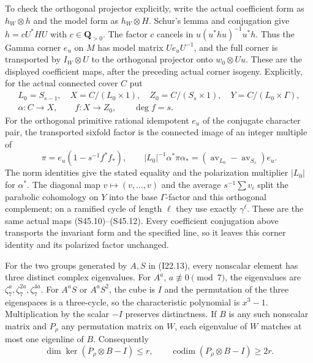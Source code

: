 To check the orthogonal projector explicitly, write the
actual coefficient form as $h_W\otimes h$ and the model
form as $h_W\otimes H$. Schur's lemma and conjugation give
$h=cU^*HU$ with $c\in\mathbf Q_{>0}$. The factor $c$
cancels in $u(u^*hu)^{-1}u^*h$. Thus the Gamma corner
$e_u$ on $M$ has model matrix $Ue_uU^{-1}$, and the full
corner is transported by $I_W\otimes U$ to the orthogonal
projector onto $w_0\otimes Uu$. These are the displayed
coefficient maps, after the preceding actual corner isogeny.
Explicitly, for the actual connected cover $C$ put
\[
 \begin{gathered}
 L_0=S_{s-1},\quad X=C/(L_0\times1),\quad
 Z_0=C/(S_s\times1),\quad Y=C/(L_0\times\Gamma),\\
 \alpha:C\to X,\qquad f:X\to Z_0,\qquad\deg f=s.
 \end{gathered}                                             \tag{I22.15}
\]
For the orthogonal primitive rational idempotent $e_u$
of the conjugate character pair, the transported sixfold factor is
the connected image of an integer multiple of
\[
 \pi=e_u\left(1-s^{-1}f^*f_*\right),\qquad
 |L_0|^{-1}\alpha^*\pi\alpha_*
       =(\operatorname{av}_{L_0}-\operatorname{av}_{S_s})e_u.
                                                               \tag{I22.16}
\]
The norm identities give the stated equality and the
polarization multiplier $|L_0|$ for $\alpha^*$.
The diagonal map $v\mapsto(v,\ldots,v)$ and the average
$s^{-1}\sum v_i$ split the parabolic cohomology on $Y$
into the base $\Gamma$-factor and this orthogonal complement;
on a ramified cycle of length $\ell$ they use exactly
$\gamma^\ell$. These are the same actual maps (S45.10)--(S45.12).
Every coefficient conjugation above transports the invariant
form and the specified line, so it leaves this corner identity
and its polarized factor unchanged.

For the two groups generated by $A,S$ in (I22.13), every
nonscalar element has three distinct complex eigenvalues.
For $A^a$, $a\not\equiv0\pmod7$, the eigenvalues are
$\zeta_7^a,\zeta_7^{2a},\zeta_7^{4a}$. For $A^aS$
or $A^aS^2$, the cube is $I$ and the permutation of the
three eigenspaces is a three-cycle, so the characteristic
polynomial is $x^3-1$. Multiplication by the scalar $-I$
preserves distinctness. If $B$ is any such nonscalar
matrix and $P_\rho$ any permutation matrix on $W$, each
eigenvalue of $W$ matches at most one eigenline of $B$.
Consequently
\[
 \dim\ker(P_\rho\otimes B-I)\le r,
 \qquad \operatorname{codim}(P_\rho\otimes B-I)\ge2r.
                                                               \tag{I22.17}
\]

